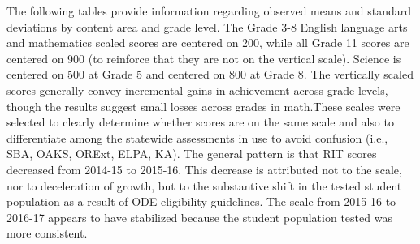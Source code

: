 \documentclass[]{article}
\begin{document}
The following tables provide information regarding observed means and
standard deviations by content area and grade level. The Grade 3-8
English language arts and mathematics scaled scores are centered on 200,
while all Grade 11 scores are centered on 900 (to reinforce that they
are not on the vertical scale). Science is centered on 500 at Grade 5
and centered on 800 at Grade 8. The vertically scaled scores generally
convey incremental gains in achievement across grade levels, though the
results suggest small losses across grades in math.These scales were
selected to clearly determine whether scores are on the same scale and
also to differentiate among the statewide assessments in use to avoid
confusion (i.e., SBA, OAKS, ORExt, ELPA, KA). The general pattern is
that RIT scores decreased from 2014-15 to 2015-16. This decrease is
attributed not to the scale, nor to deceleration of growth, but to the
substantive shift in the tested student population as a result of ODE
eligibility guidelines. The scale from 2015-16 to 2016-17 appears to
have stabilized because the student population tested was more
consistent.
\end{document}
